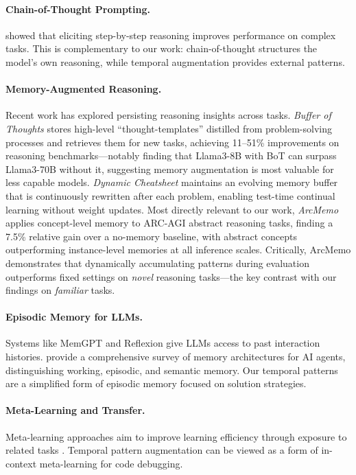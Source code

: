 \documentclass[11pt]{article}
\begin{document}
\paragraph{Chain-of-Thought Prompting.} \citet{wei2022chain} showed that eliciting step-by-step reasoning improves performance on complex tasks. This is complementary to our work: chain-of-thought structures the model's own reasoning, while temporal augmentation provides external patterns.

\paragraph{Memory-Augmented Reasoning.} Recent work has explored persisting reasoning insights across tasks. \emph{Buffer of Thoughts} \citep{yang2024buffer} stores high-level ``thought-templates'' distilled from problem-solving processes and retrieves them for new tasks, achieving 11--51\% improvements on reasoning benchmarks---notably finding that Llama3-8B with BoT can surpass Llama3-70B without it, suggesting memory augmentation is most valuable for less capable models. \emph{Dynamic Cheatsheet} \citep{suzgun2025dynamic} maintains an evolving memory buffer that is continuously rewritten after each problem, enabling test-time continual learning without weight updates. Most directly relevant to our work, \emph{ArcMemo} \citep{ho2025arcmemo} applies concept-level memory to ARC-AGI abstract reasoning tasks, finding a 7.5\% relative gain over a no-memory baseline, with abstract concepts outperforming instance-level memories at all inference scales. Critically, ArcMemo demonstrates that dynamically accumulating patterns during evaluation outperforms fixed settings on \emph{novel} reasoning tasks---the key contrast with our findings on \emph{familiar} tasks.

\paragraph{Episodic Memory for LLMs.} Systems like MemGPT \citep{packer2023memgpt} and Reflexion \citep{shinn2023reflexion} give LLMs access to past interaction histories. \citet{hu2025memory} provide a comprehensive survey of memory architectures for AI agents, distinguishing working, episodic, and semantic memory. Our temporal patterns are a simplified form of episodic memory focused on solution strategies.

\paragraph{Meta-Learning and Transfer.} Meta-learning approaches aim to improve learning efficiency through exposure to related tasks \citep{finn2017model}. Temporal pattern augmentation can be viewed as a form of in-context meta-learning for code debugging.
\end{document}

